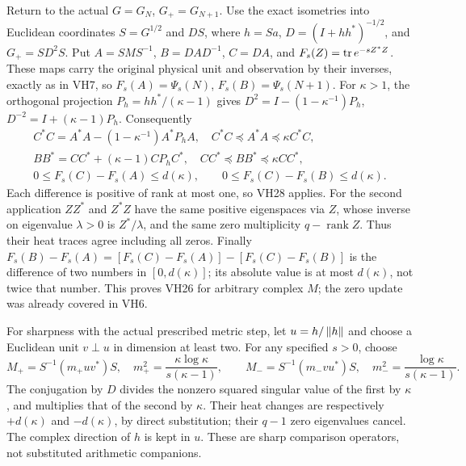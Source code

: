 \documentclass[11pt]{article}
\begin{document}
Return to the actual \(G=G_N\), \(G_+=G_{N+1}\). Use the exact
isometries into Euclidean coordinates
\(S=G^{1/2}\) and \(DS\), where
\(h=Sa\), \(D=(I+hh^*)^{-1/2}\), and
\(G_+=S D^2 S\). Put \(A=SMS^{-1}\), \(B=DAD^{-1}\), \(C=DA\),
and \(F_s(Z)=\operatorname{tr} e^{-sZ^*Z}\). These maps carry the original physical
unit and observation by their inverses, exactly as in VH7, so
\(F_s(A)=\Psi_s(N)\), \(F_s(B)=\Psi_s(N+1)\).
For \(\kappa>1\), the orthogonal projection
\(P_h=hh^*/(\kappa-1)\) gives
\(D^2=I-(1-\kappa^{-1})P_h\), \(D^{-2}=I+(\kappa-1)P_h\).
Consequently
\begin{equation}\tag{VH29}\label{hvh:VH29}
\begin{gathered}
C^*C=A^*A-(1-\kappa^{-1})A^*P_hA,\quad
C^*C\preceq A^*A\preceq\kappa C^*C,\\
BB^*=CC^*+(\kappa-1)CP_hC^*,\quad
CC^*\preceq BB^*\preceq\kappa CC^*,\\
0\le F_s(C)-F_s(A)\le d(\kappa),\qquad
0\le F_s(C)-F_s(B)\le d(\kappa).
\end{gathered}
\end{equation}
Each difference is positive of rank at most one, so VH28 applies.
For the second application \(ZZ^*\) and \(Z^*Z\) have the same
positive eigenspaces via \(Z\), whose inverse on eigenvalue \(\lambda>0\)
is \(Z^*/\lambda\), and the same zero multiplicity \(q-\operatorname{rank}Z\).
Thus their heat traces agree including all zeros. Finally
\(F_s(B)-F_s(A)=[F_s(C)-F_s(A)]-[F_s(C)-F_s(B)]\) is the difference
of two numbers in \([0,d(\kappa)]\); its absolute value is at most
\(d(\kappa)\), not twice that number. This proves VH26 for arbitrary
complex \(M\); the zero update was already covered in VH6.

For sharpness with the actual prescribed metric step, let \(u=h/\left\lVert h\right\rVert\)
and choose a Euclidean unit \(v\perp u\) in dimension at least two.
For any specified \(s>0\), choose
\begin{equation}\tag{VH30}\label{hvh:VH30}
M_+=S^{-1}(m_+uv^*)S,\quad
m_+^2=\frac{\kappa\log\kappa}{s(\kappa-1)},\qquad
M_-=S^{-1}(m_-vu^*)S,\quad
m_-^2=\frac{\log\kappa}{s(\kappa-1)}.
\end{equation}
The conjugation by \(D\) divides the nonzero squared singular value
of the first by \(\kappa\), and multiplies that of the second by
\(\kappa\). Their heat changes are respectively
\(+d(\kappa)\) and \(-d(\kappa)\), by direct substitution; their
\(q-1\) zero eigenvalues cancel. The complex direction of \(h\) is
kept in \(u\). These are sharp comparison operators, not substituted
arithmetic companions.
\end{document}

